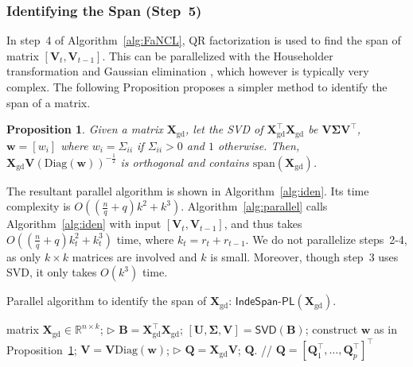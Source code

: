 \documentclass[10pt,journal,compsoc]{IEEEtran}
\newtheorem{prop}[theorem]{Proposition}
\def \R{\mathbb R}
\newcommand{\X}{\mathbf{X}}
\newcommand{\Span}[1]{\text{span}(#1)}
\newcommand{\Diag}[1]{\text{Diag}(#1)}
\begin{document}
\subsubsection{Identifying the Span (Step~5)}
\label{sec:qrfact}

In step~4 of Algorithm~\ref{alg:FaNCL},
QR factorization is used 
to find the span of matrix
   $[\mathbf{V}_t, \mathbf{V}_{t - 1}]$.
This can be parallelized with the Householder transformation and Gaussian elimination
\cite{bertsekas1997parallel}, which however
is typically very complex. 
The following Proposition proposes a simpler method to identify the span of a matrix.


\begin{prop} \label{pr:qr}
Given a matrix $\X_{\text{gd}}$,
let the SVD of $\X_{\text{gd}} ^{\top} \X_{\text{gd}}$ be $\mathbf{V} \mathbf{\Sigma}
\mathbf{V}^{\top}$,
$\mathbf{w} = [w_i]$ where $ w_i = \Sigma_{ii}$ if $\Sigma_{ii} > 0$ and $1$ otherwise.
Then, 
$\X_{\text{gd}} \mathbf{V} \left( \Diag{\mathbf{w}} \right)^{-\frac{1}{2}}$ is orthogonal and contains $\Span{\X_{\text{gd}}}$.
\end{prop}

The resultant parallel algorithm is shown in Algorithm~\ref{alg:iden}.
Its time complexity is $O( (\frac{n}{q} + q)k^2 + k^3 )$.
Algorithm~\ref{alg:parallel} calls Algorithm~\ref{alg:iden} 
with 
input
$[\mathbf{V}_t, \mathbf{V}_{t - 1}]$, and
thus takes
$O( (\frac{n}{q} + q)k_t^2 + k_t^3 )$
time,
where $k_t = r_t + r_{t - 1}$.   
We do not parallelize steps~2-4,
	as only 
	$k \times k$ 
	matrices 
	are involved and $k$ is small. Moreover,
though step~3 uses SVD, it only takes $O(k^3)$ time.

\begin{algorithm}[ht]
\caption{Parallel algorithm to identify the span of $\X_{\text{gd}}$: $\textsf{IndeSpan-PL}(\X_{\text{gd}})$.}
\begin{algorithmic}[1]
	\REQUIRE matrix $\X_{\text{gd}} \in \R^{n \times k}$;
	\STATE $\rhd$ $\mathbf{B} = \X_{\text{gd}}^{\top} \X_{\text{gd}}$;
	\STATE $[\mathbf{U}, \mathbf{\Sigma}, \mathbf{V}] = \textsf{SVD}(\mathbf{B})$; 
	\STATE construct $\mathbf{w}$ as in Proposition~\ref{pr:qr};
	\STATE $\mathbf{V} = \mathbf{V} \Diag{\mathbf{w}}$;
	\STATE $\rhd$ $\mathbf{Q} = \X_{\text{gd}} \mathbf{V} $;
	\RETURN $\mathbf{Q}$. // $\mathbf{Q} = [\mathbf{Q}_1^{\top}, \dots, \mathbf{Q}_p^{\top}]^{\top}$
\end{algorithmic}
\label{alg:iden}
\end{algorithm} 
\end{document}
